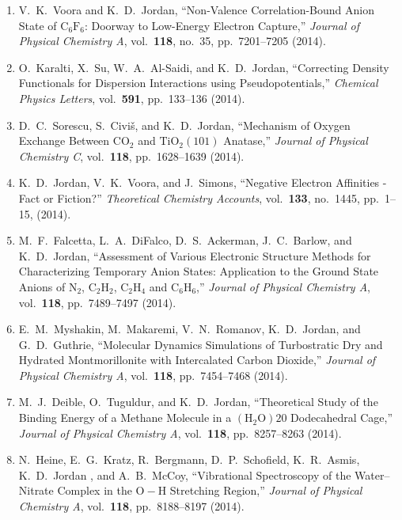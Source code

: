 \begin{enumerate}
\item V.\ K.\ Voora and K.\ D.\ Jordan, ``Non-Valence
  Correlation-Bound Anion State of $\mathrm{C}_6\mathrm{F}_6$: Doorway
  to Low-Energy Electron Capture,'' \textit{Journal of Physical
    Chemistry A}, vol.\ \textbf{118}, no.\ 35, pp.\ 7201--7205 (2014).

\item O.\ Karalti, X.\ Su, W.\ A.\ Al-Saidi, and K.\ D.\ Jordan,
  ``Correcting Density Functionals for Dispersion Interactions using
  Pseudopotentials,'' \textit{Chemical Physics Letters},
  vol.\ \textbf{591}, pp.\ 133--136 (2014).

\item D.\ C.\ Sorescu, S.\ Civi\v{s}, and K.\ D.\ Jordan, ``Mechanism
  of Oxygen Exchange Between $\mathrm{CO}_2$ and
  $\mathrm{Ti}\mathrm{O}_2(101)$ Anatase,'' \textit{Journal of
    Physical Chemistry C}, vol.\ \textbf{118}, pp.\ 1628--1639 (2014).

\item K.\ D.\ Jordan, V.\ K.\ Voora, and J.\ Simons, ``Negative
  Electron Affinities - Fact or Fiction?'' \textit{Theoretical
    Chemistry Accounts}, vol.\ \textbf{133}, no.\ 1445, pp.\ 1--15,
  (2014).

\item M.\ F.\ Falcetta, L.\ A.\ DiFalco, D.\ S.\ Ackerman,
  J.\ C.\ Barlow, and K.\ D.\ Jordan, ``Assessment of Various
  Electronic Structure Methods for Characterizing Temporary Anion
  States: Application to the Ground State Anions of $\mathrm{N}_2$,
  $\mathrm{C}_2\mathrm{H}_2$, $\mathrm{C}_2\mathrm{H}_4$ and
  $\mathrm{C}_6\mathrm{H}_6$,'' \textit{Journal of Physical Chemistry
    A}, vol.\ \textbf{118}, pp.\ 7489--7497 (2014).

\item E.\ M.\ Myshakin, M.\ Makaremi, V.\ N.\ Romanov, K.\ D.\ Jordan,
  and G.\ D.\ Guthrie, ``Molecular Dynamics Simulations of
  Turbostratic Dry and Hydrated Montmorillonite with Intercalated
  Carbon Dioxide,'' \textit{Journal of Physical Chemistry A},
  vol.\ \textbf{118}, pp.\ 7454--7468 (2014).

\item M.\ J.\ Deible, O.\ Tuguldur, and K.\ D.\ Jordan, ``Theoretical
  Study of the Binding Energy of a Methane Molecule in a
  $(\mathrm{H}_2\mathrm{O})20$ Dodecahedral Cage,'' \textit{Journal of
    Physical Chemistry A}, vol.\ \textbf{118}, pp.\ 8257--8263 (2014).

\item N.\ Heine, E.\ G.\ Kratz, R.\ Bergmann, D.\ P.\ Schofield,
  K.\ R.\ Asmis, K.\ D.\ Jordan , and A.\ B.\ McCoy, ``Vibrational
  Spectroscopy of the Water–Nitrate Complex in the
  $\mathrm{O}-\mathrm{H}$ Stretching Region,'' \textit{Journal of
    Physical Chemistry A}, vol.\ \textbf{118}, pp.\ 8188--8197 (2014).


\end{enumerate}
